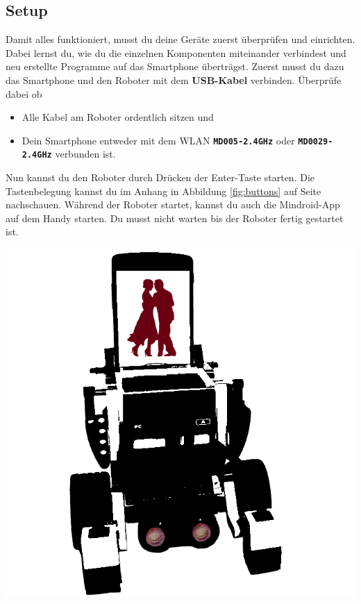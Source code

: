 \documentclass[
	12pt,
	article,
	type=bsc, %
	colorbacktitle,
	instlogo,
	accentcolor=tud1c,
	draft,
	german,
	twoside
]{tudexercise}
\newcommand{\bfcode}[1]{\texttt{\textbf{#1}}}
\begin{document}
	\subsection{Setup}
	Damit alles funktioniert, musst du deine Geräte zuerst überprüfen und einrichten. Dabei lernst du, wie du die einzelnen Komponenten miteinander verbindest und neu erstellte Programme auf das Smartphone überträgst.
	Zuerst musst du dazu das Smartphone und den Roboter mit dem \textbf{USB-Kabel} verbinden. Überprüfe dabei ob
	\begin{itemize}
		\item Alle Kabel am Roboter ordentlich sitzen und
		\item Dein Smartphone entweder mit dem WLAN \bfcode{MD005-2.4GHz} oder \bfcode{MD0029-2.4GHz} verbunden ist.
	\end{itemize}
	\begin{minipage}{.8\textwidth}
		Nun kannst du den Roboter durch Drücken der Enter-Taste starten.
		Die Tastenbelegung kannst du im Anhang in Abbildung \ref{fig:buttons} auf Seite \pageref{fig:buttons} nachschauen. Während der Roboter startet, kannst du auch die Mindroid-App auf dem Handy starten.
		Du musst nicht warten bis der Roboter fertig gestartet ist.
	\end{minipage}
	\begin{minipage}{.19\textwidth}
	\includegraphics[width=\textwidth]{img/app_logo}	
	\end{minipage}
	
\end{document}
